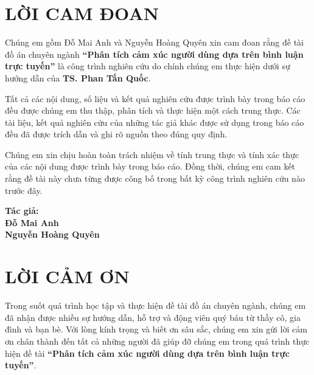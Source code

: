 \documentclass[14pt, a4paper]{report}
\begin{document}



\frontmatter
{}
\pagestyle{frontmatter}

\chapter*{LỜI CAM ĐOAN}

Chúng em gồm Đỗ Mai Anh và Nguyễn Hoàng Quyên xin cam đoan rằng đề tài đồ án chuyên ngành \textbf{``Phân tích cảm xúc người dùng dựa trên bình luận trực tuyến''} là công trình nghiên cứu do chính chúng em thực hiện dưới sự hướng dẫn của \textbf{TS. Phan Tấn Quốc}.

Tất cả các nội dung, số liệu và kết quả nghiên cứu được trình bày trong báo cáo đều được chúng em thu thập, phân tích và thực hiện một cách trung thực. Các tài liệu, kết quả nghiên cứu của những tác giả khác được sử dụng trong báo cáo đều đã được trích dẫn và ghi rõ nguồn theo đúng quy định.

Chúng em xin chịu hoàn toàn trách nhiệm về tính trung thực và tính xác thực của các nội dung được trình bày trong báo cáo. Đồng thời, chúng em cam kết rằng đề tài này chưa từng được công bố trong bất kỳ công trình nghiên cứu nào trước đây.

\vspace{2cm}

\hfill \textbf{Tác giả:} \\
\hfill \textbf{Đỗ Mai Anh} \\
\hfill \textbf{Nguyễn Hoàng Quyên}

\newpage

\chapter*{LỜI CẢM ƠN}

Trong suốt quá trình học tập và thực hiện đề tài đồ án chuyên ngành, chúng em đã nhận được nhiều sự hướng dẫn, hỗ trợ và động viên quý báu từ thầy cô, gia đình và bạn bè. Với lòng kính trọng và biết ơn sâu sắc, chúng em xin gửi lời cảm ơn chân thành đến tất cả những người đã giúp đỡ chúng em trong quá trình thực hiện đề tài \textbf{``Phân tích cảm xúc người dùng dựa trên bình luận trực tuyến''}.
\end{document}
